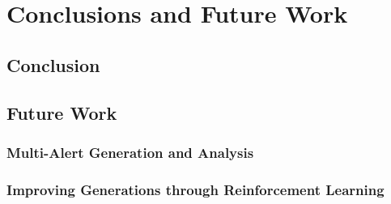 %
%
%

\chapter{Conclusions and Future Work}

\section{Conclusion}

\section{Future Work}

\subsection{Multi-Alert Generation and Analysis}

\subsection{Improving Generations through Reinforcement Learning}
